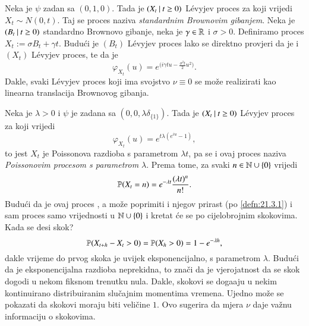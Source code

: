 \begin{pr}  \label{pr:21.8}
    Neka je $\psi$ zadan sa $(0,1,0)$.
    Tada je $({X_t} \: | \: {t \geq 0})$ L\' evyjev proces za koji vrijedi $X_t \sim N(0, t)$.
    Taj se proces naziva \emph{standardnim Brownovim gibanjem}.
    Neka je $({B_t} \: | \: {t \geq 0})$ standardno Brownovo gibanje, neka je $\gamma \in \mathbb{R}$ i $\sigma > 0$.
    Definiramo proces $X_t := \sigma B_t + \gamma t$.
    Budu\' ci je $(B_t)$ L\' evyjev proces lako se direktno provjeri da je i $(X_t)$ L\' evyjev proces, te da je
    \begin{equation}    \label{jed:21.9}
        \varphi_{X_t} (u) = e^{\big( i \gamma t u - \frac{\sigma^2 t}{2} u^2 \big)}.
    \end{equation}
    Dakle, svaki L\' evyjev proces koji ima svojstvo $\nu \equiv 0$ se mo\v ze realizirati kao linearna translacija Brownovog gibanja.
\end{pr}

\begin{pr}  \label{pr:21.9}
    Neka je $\lambda > 0$ i $\psi$ je zadana sa $(0,0,\lambda \delta_{\{1\}})$.
    Tada je $({X_t} \: | \: {t \geq 0})$ L\' evyjev proces za koji vrijedi
    \begin{equation*}
        \varphi_{X_t} (u) = e^{t \lambda (e^{i u} - 1)},
    \end{equation*}
    to jest $X_t$ je Poissonova razdioba s parametrom $\lambda t$, pa se i ovaj proces naziva \emph{Poissonovim procesom s parametrom $\lambda$}.
    Prema tome, za svaki $n \in \mathbb{N} \cup \{0\}$ vrijedi
    \begin{equation}    \label{jed:21.10}
        \mathbb{P} (X_t = n) = e^{- \lambda t} \frac{(\lambda t)^n}{n !}.
    \end{equation}
    Budu\' ci da je ovaj proces \cadlag, a mo\v ze poprimiti i njegov prirast (po \ref{defn:21.3.1}) i sam proces samo vrijednosti u $\mathbb{N} \cup \{0\}$ i kretat \' ce se po cijelobrojnim skokovima.
    Kada se desi skok?
    \begin{equation*}
        \mathbb{P} (X_{t + h} - X_t > 0) = \mathbb{P} (X_h > 0) = 1 - e^{- \lambda h},
    \end{equation*}
    dakle vrijeme do prvog skoka je uvijek eksponencijalno, s parametrom $\lambda$.
    Budu\' ci da je eksponencijalna razdioba neprekidna, to zna\v ci da je vjerojatnost da se skok dogodi u nekom fiksnom trenutku nula.
    Dakle, skokovi se doga\dj aju u nekim kontinuirano distribuiranim slu\v cajnim momentima vremena.
    Ujedno mo\v ze se pokazati da skokovi moraju biti veli\v cine $1$.
    Ovo sugerira da mjera $\nu$ daje va\v znu informaciju o skokovima.
\end{pr}

